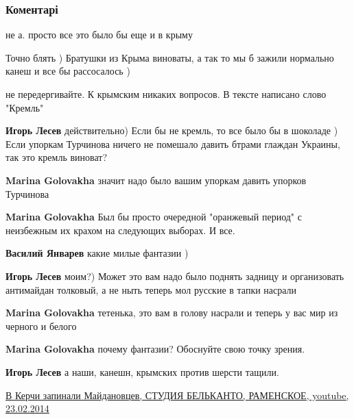  
 
 
 
 
\subsubsection{Коментарі}

\begin{itemize} %
не а. просто все это было бы еще и в крыму

Точно блять ) Братушки из Крыма виноваты, а так то мы б зажили нормально канеш и все бы рассосалось )

\begin{itemize} %
не передергивайте. К крымским никаких вопросов. В тексте написано слово "Кремль"

\textbf{Игорь Лесев} действительно) Если бы не кремль, то все было бы в шоколаде ) Если упоркам Турчинова ничего не помешало давить бтрами глаждан Украины, так это кремль виноват?

\textbf{Marina Golovakha} значит надо было вашим упоркам давить упорков Турчинова

\textbf{Marina Golovakha} Был бы просто очередной "оранжевый период" с неизбежным их крахом на следующих выборах. И все.

\textbf{Василий Январев} какие милые фантазии )

\textbf{Игорь Лесев} моим?) Может это вам надо было поднять задницу и организовать антимайдан толковый, а не ныть теперь мол русские в тапки насрали

\textbf{Marina Golovakha} тетенька, это вам в голову насрали и теперь у вас мир из черного и белого

\textbf{Marina Golovakha} почему фантазии? Обоснуйте свою точку зрения.

\textbf{Игорь Лесев} а наши, канешн, крымских против шерсти тащили. 

\href{https://youtu.be/wQTUceLw5YU}{%
В Керчи запинали Майдановцев, СТУДИЯ БЕЛЬКАНТО, РАМЕНСКОЕ, youtube, 23.02.2014%
}


\end{itemize}
\end{itemize}
